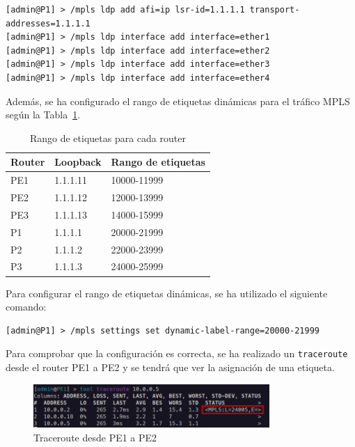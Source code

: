 \begin{lstlisting}[language=RouterOS]
[admin@P1] > /mpls ldp add afi=ip lsr-id=1.1.1.1 transport-addresses=1.1.1.1
[admin@P1] > /mpls ldp interface add interface=ether1
[admin@P1] > /mpls ldp interface add interface=ether2
[admin@P1] > /mpls ldp interface add interface=ether3
[admin@P1] > /mpls ldp interface add interface=ether4
\end{lstlisting}

Además, se ha configurado el rango de etiquetas dinámicas para el tráfico MPLS según la Tabla~\ref{tab:rango_etiquetas_mpls}.

\begin{table}[H]
	\centering
	\begin{tabular}{|l|l|l|}
		\hline
		\textbf{Router} & \textbf{Loopback} & \textbf{Rango de etiquetas} \\ \hline
		PE1             & 1.1.1.11          & 10000-11999                 \\ \hline
		PE2             & 1.1.1.12          & 12000-13999                 \\ \hline
		PE3             & 1.1.1.13          & 14000-15999                 \\ \hline
		P1              & 1.1.1.1           & 20000-21999                 \\ \hline
		P2              & 1.1.1.2           & 22000-23999                 \\ \hline
		P3              & 1.1.1.3           & 24000-25999                 \\ \hline
	\end{tabular}%
	\caption{Rango de etiquetas para cada router}
	\label{tab:rango_etiquetas_mpls}
\end{table}

\noindent
Para configurar el rango de etiquetas dinámicas, se ha utilizado el siguiente comando:
\begin{lstlisting}[language=RouterOS]
[admin@P1] > /mpls settings set dynamic-label-range=20000-21999
\end{lstlisting}

%

Para comprobar que la configuración es correcta, se ha realizado un \texttt{traceroute} desde el router PE1 a PE2 y
se tendrá que ver la asignación de una etiqueta.
\begin{figure}[H]
	\centering
	\includegraphics[width=0.8\textwidth]{images/ldp_test.png}
	\caption{Traceroute desde PE1 a PE2}
	\label{fig:traceroute}
\end{figure}

